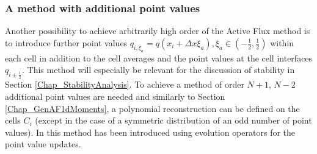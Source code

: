 \documentclass[12pt,a4paper]{article}
\begin{document}
\subsubsection{A method with additional point values}
\label{Chap_AFaddPV1d}
Another possibility to achieve arbitrarily high order of the Active Flux method is to introduce further point values \(q_{i,\xi_a}= q(x_i + \Delta x \xi_a), \xi_a \in (-\tfrac{1}{2}, \tfrac{1}{2})\) within each cell in addition to the cell averages and the point values at the cell interfaces \(q_{i\pm\frac{1}{2}}\). This method will especially be relevant for the discussion of stability in Section \ref{Chap_StabilityAnalysis}.
To achieve a method of order \(N+1\), \(N-2\) additional point values are needed and similarly to Section \ref{Chap_GenAF1dMoments}, a polynomial reconstruction can be defined on the cells \(C_i\) (except in the case of a symmetric distribution of an odd number of point values). 
In \cite{AB2023ExtensionAF} this method has been introduced using evolution operators for the point value updates.\\
\end{document}
